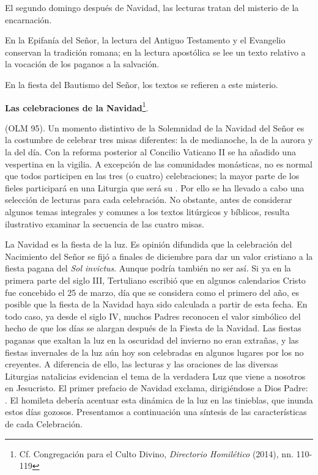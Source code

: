 \begin{body}
\begin{body}
El segundo domingo después de Navidad, las lecturas tratan del misterio de la encarnación.

En la Epifanía del Señor, la lectura del Antiguo Testamento y el Evangelio conservan la tradición romana; en la lectura apostólica se lee un texto relativo a la vocación de los paganos a la salvación.

En la fiesta del Bautismo del Señor, los textos se refieren a este misterio.

\textbf{Las celebraciones de la Navidad}\footnote{Cf. Congregación para el Culto Divino, \emph{Directorio Homilético} (2014), nn. 110-119}.

 (OLM 95). Un momento distintivo de la Solemnidad de la Navidad del Señor es la costumbre de celebrar tres misas diferentes: la de medianoche, la de la aurora y la del día. Con la reforma posterior al Concilio Vaticano II se ha añadido una vespertina en la vigilia. A excepción de las comunidades monásticas, no es normal que todos participen en las tres (o cuatro) celebraciones; la mayor parte de los fieles participará en una Liturgia que será su . Por ello se ha llevado a cabo una selección de lecturas para cada celebración. No obstante, antes de considerar algunos temas integrales y comunes a los textos litúrgicos y bíblicos, resulta ilustrativo examinar la secuencia de las cuatro misas.

La Navidad es la fiesta de la luz. Es opinión difundida que la celebración del Nacimiento del Señor se fijó a finales de diciembre para dar un valor cristiano a la fiesta pagana del \emph{Sol invictus}. Aunque podría también no ser así. Si ya en la primera parte del siglo III, Tertuliano escribió que en algunos calendarios Cristo fue concebido el 25 de marzo, día que se considera como el primero del año, es posible que la fiesta de la Navidad haya sido calculada a partir de esta fecha. En todo caso, ya desde el siglo IV, muchos Padres reconocen el valor simbólico del hecho de que los días se alargan después de la Fiesta de la Navidad. Las fiestas paganas que exaltan la luz en la oscuridad del invierno no eran extrañas, y las fiestas invernales de la luz aún hoy son celebradas en algunos lugares por los no creyentes. A diferencia de ello, las lecturas y las oraciones de las diversas Liturgias natalicias evidencian el tema de la verdadera Luz que viene a nosotros en Jesucristo. El primer prefacio de Navidad exclama, dirigiéndose a Dios Padre: . El homileta debería acentuar esta dinámica de la luz en las tinieblas, que inunda estos días gozosos. Presentamos a continuación una síntesis de las características de cada Celebración.


\end{body}
\end{body}
